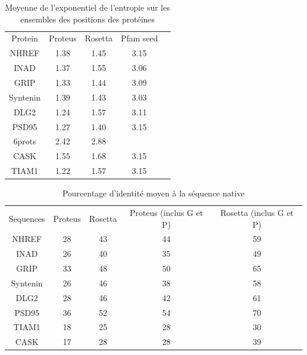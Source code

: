    \begin{table}[!htbp]
      \centering

      \begin{tabular}{ccccc}

        \toprule
        Protein & Proteus & Rosetta & Pfam seed \\
        \cmidrule{1-4}
        NHREF  & 1.38 & 1.45 & 3.15  \\
        INAD  & 1.37 & 1.55 & 3.06  \\
        GRIP  & 1.33 & 1.44 & 3.09  \\
        Syntenin  & 1.39 & 1.43 & 3.03  \\
        DLG2  & 1.24 & 1.57 & 3.11  \\
        PSD95  & 1.27 & 1.40 & 3.15  \\
        6prots & 2.42  & 2.88 &    \\
        CASK  & 1.55 & 1.68 & 3.15  \\
        TIAM1 & 1.22 & 1.57 & 3.15  \\

        \bottomrule

      \end{tabular}      
      \caption{Moyenne de l'exponentiel de l'entropie sur les ensembles des positions des protéines}
\label{tab:Entropie_PDZ}      
    \end{table}


        \begin{table}[!htbp]
      \centering

      \begin{tabular}{ccccc}

        \toprule
        Sequences & Proteus & Rosetta & Proteus (inclus G et P) & Rosetta (inclus G et P)\\
        \cmidrule{1-5}
        NHREF  & 28 &  43 & 44 & 59 \\
        INAD  & 26 &  40 & 35 & 49 \\
        GRIP  & 33 &  48 & 50 & 65 \\
        Syntenin  & 26 &  46 & 38 & 58 \\
        DLG2  & 28 &  46 & 42 & 61 \\
        PSD95  & 36 &  52 & 54 & 70 \\
        TIAM1 & 18 &  25 & 28 & 30 \\
        CASK  & 17 &  28 & 28 &  39 \\

        \bottomrule

      \end{tabular}      
      \caption{Pourcentage d'identité moyen à la séquence native}
\label{tab:Entropie_PDZ}      
    \end{table}

